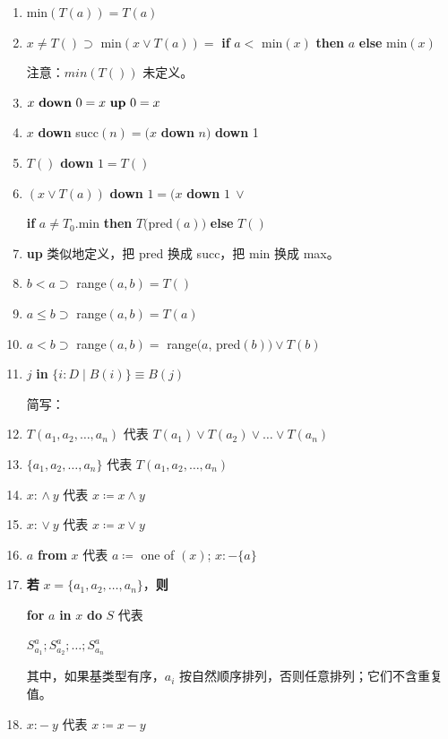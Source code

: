 \begin{enumerate}[wide, nosep, label=(\arabic*)]
	\item min$(T(a)) = T(a)$
	\item $x \neq T() \supset$ min$(x \lor T(a)) =$ \textbf{if} $a <$ min$(x)$ \textbf{then} $a$ \textbf{else} min$(x)$

	\noindent
	注意：$min(T())$ 未定义。

	\item $x \text{ \textbf{down} } 0 = x \text{ \textbf{up} } 0 = x$
	\item $x$ \textbf{down} succ$(n) = (x$ \textbf{down} $n)$ \textbf{down} 1
	\item $T()$ \textbf{down} $1 = T()$
	\item $(x \lor T(a))$ \textbf{down} $1 = (x$ \textbf{down} $1\ \lor$
	
	\quad \textbf{if} $a \neq T_0$.min \textbf{then} $T($pred$(a))$ \textbf{else} $T()$
	
	\item[(27)\textendash{}(28)] \textbf{up} 类似地定义，把 pred 换成 succ，把 min 换成 max。
	\setcounter{enumi}{28}

	\item $b < a \supset$ range$(a, b) = T()$
	\item $a \leqslant b \supset$ range$(a, b) = T(a)$
	\item $a < b \supset$ range$(a, b) =$ range$(a$, pred$(b)) \lor T(b)$
	\item $j$ \textbf{in} $\{i:D \mid B(i)\} \equiv B(j)$

	\noindent
	简写：
	
	\item $T(a_1, a_2, \dots, a_n)$ 代表 $T(a_1) \lor T(a_2) \lor \dots \lor T(a_n)$
	\item $\{a_1, a_2, \dots, a_n\}$ 代表 $T(a_1, a_2, \dots, a_n)$
	\item $x$: $\land\ y$ 代表 $x \coloneq x \land y$
	\item $x$: $\lor\ y$ 代表 $x \coloneq x \lor y$
	\item $a$ \textbf{from} $x$ 代表 $a \coloneq$ one of $(x)$; $x: - \{a\}$
	\item \textbf{若} $x = \{a_1, a_2, \dots, a_n\}$，\textbf{则}
	
	\qquad\quad \textbf{for} $a$ \textbf{in} $x$ \textbf{do} $S$ 代表
	
	\qquad\quad \quad $S_{a_1}^a; S_{a_2}^a ; \dots; S_{a_n}^a$
	
	\noindent
	其中，如果基类型有序，$a_i$ 按自然顺序排列，否则任意排列；它们不含重复值。
	
	\item $x: -\ y$ 代表 $x \coloneq x - y$
\end{enumerate}

